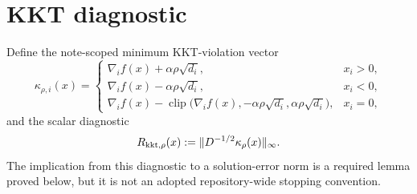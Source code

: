 \section{KKT diagnostic}

Define the note-scoped minimum KKT-violation vector
\begin{equation}
\kappa_{\rho,i}(x)=
\begin{cases}
\nabla_i f(x)+\alpha\rho\sqrt{d_i},&x_i>0,\\
\nabla_i f(x)-\alpha\rho\sqrt{d_i},&x_i<0,\\
\nabla_i f(x)-\operatorname{clip}
  \bigl(\nabla_i f(x),-\alpha\rho\sqrt{d_i},
                    \alpha\rho\sqrt{d_i}\bigr),&x_i=0,
\end{cases}
\label{eq:aesp-cd-kkt-vector}
\end{equation}
and the scalar diagnostic
\begin{equation}
  R_{\mathrm{kkt},\rho}(x)
  :=\lVert D^{-1/2}\kappa_\rho(x)\rVert_\infty.
  \label{eq:aesp-cd-kkt-diagnostic}
\end{equation}
The implication from this diagnostic to a solution-error norm is a required
lemma proved below, but it is not an adopted repository-wide stopping
convention.
